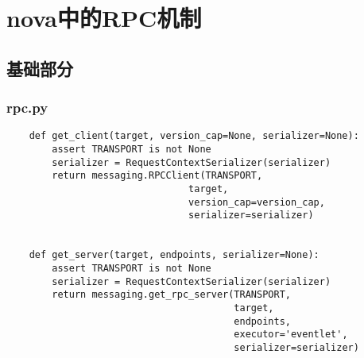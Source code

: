\documentclass[a4paper,left=2.5cm,right=2.5cm,11pt]{article}
\begin{document}
\tableofcontents

\clearpage

\section{nova中的RPC机制}
\subsection{基础部分}
\subsubsection{rpc.py}
    \begin{lstlisting}
    def get_client(target, version_cap=None, serializer=None):
        assert TRANSPORT is not None
        serializer = RequestContextSerializer(serializer)
        return messaging.RPCClient(TRANSPORT,
                                target,
                                version_cap=version_cap,
                                serializer=serializer)


    def get_server(target, endpoints, serializer=None):
        assert TRANSPORT is not None
        serializer = RequestContextSerializer(serializer)
        return messaging.get_rpc_server(TRANSPORT,
                                        target,
                                        endpoints,
                                        executor='eventlet',
                                        serializer=serializer)
    \end{lstlisting}
\end{document}
